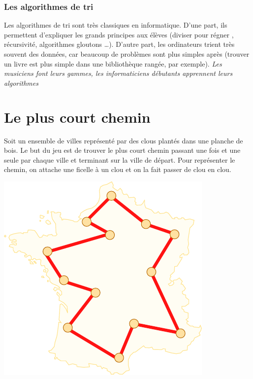 \documentclass[a5paper,pagesize,DIV=14]{scrbook}
\begin{document}
\subsection*{Les algorithmes de tri}

Les algorithmes de tri sont très classiques en informatique. D'une part, ils
permettent d'expliquer les grands principes aux élèves (\og diviser pour régner
\fg, récursivité, algorithmes gloutons {\ldots}). D'autre part, les ordinateurs trient très souvent des données, car beaucoup de problèmes sont plus simples après (trouver un livre est plus simple dans une bibliothèque rangée, par exemple). \textit{Les musiciens font leurs gammes, les informaticiens débutants apprennent leurs algorithmes}



\chapter*{Le plus court chemin}

Soit un ensemble de villes représenté par des clous plantés dans une planche de bois. Le but du jeu est de trouver le plus court chemin passant une fois et une seule par chaque ville et terminant sur la ville de départ. Pour représenter le chemin, on attache une ficelle à un clou et on la fait passer de clou en clou.

\begin{center}
  \includegraphics[width=0.5\linewidth]{img/tsp.pdf}
  \label{img:tsp}
\end{center}
\end{document}
